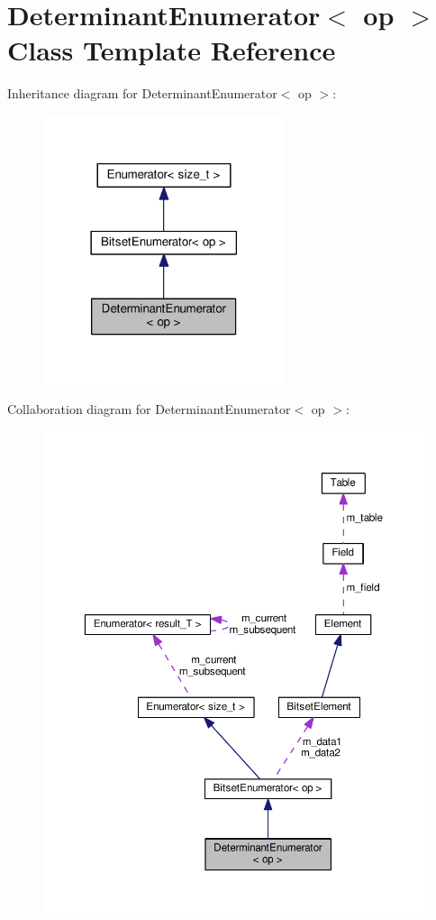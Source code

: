 \hypertarget{classDeterminantEnumerator}{}\section{Determinant\+Enumerator$<$ op $>$ Class Template Reference}
\label{classDeterminantEnumerator}


Inheritance diagram for Determinant\+Enumerator$<$ op $>$\+:\nopagebreak
\begin{figure}[H]
\begin{center}
\leavevmode
\includegraphics[width=201pt]{classDeterminantEnumerator__inherit__graph}
\end{center}
\end{figure}


Collaboration diagram for Determinant\+Enumerator$<$ op $>$\+:\nopagebreak
\begin{figure}[H]
\begin{center}
\leavevmode
\includegraphics[width=350pt]{classDeterminantEnumerator__coll__graph}
\end{center}
\end{figure}
